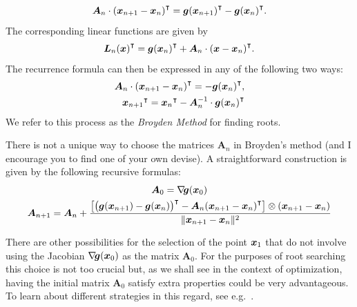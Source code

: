\begin{equation}\label{equation:SecantProperty}
\boldsymbol{A}_n \cdot {(\boldsymbol{x}_{n+1} - \boldsymbol{x}_n)}^\intercal = {\boldsymbol{g}(\boldsymbol{x}_{n+1})}^\intercal - {\boldsymbol{g}(\boldsymbol{x}_n)}^\intercal.
\end{equation}
The corresponding linear functions are given by 
\begin{equation*}
{\boldsymbol{L}_n (\boldsymbol{x})}^\intercal = {\boldsymbol{g}(\boldsymbol{x}_n)}^\intercal + \boldsymbol{A}_n \cdot {(\boldsymbol{x}- \boldsymbol{x}_n)}^\intercal.
\end{equation*}
The recurrence formula can then be expressed in any of the following two ways:
\begin{equation}
\begin{split}
\boldsymbol{A}_n \cdot {(\boldsymbol{x}_{n+1} - \boldsymbol{x}_n )}^\intercal = -{\boldsymbol{g}(\boldsymbol{x}_n)}^\intercal, \\
{\boldsymbol{x}_{n+1}}^\intercal = {\boldsymbol{x}_n}^\intercal - \boldsymbol{A}_n^{-1} \cdot {\boldsymbol{g}(\boldsymbol{x}_n)}^\intercal
\end{split}
\end{equation}
We refer to this process as the \emph{Broyden Method} for finding roots.

\begin{remark}
There is not a unique way to choose the matrices $\boldsymbol{A}_n$ in Broyden's method (and I encourage you to find one of your own devise).  A straightforward construction is given by the following recursive formulas:
\begin{gather}\index{Broyden Method!recursive formula}\index{Broyden Method!iteration}
\boldsymbol{A}_0 = \gradient{\boldsymbol{g}}(\x_0) \nonumber \\
\boldsymbol{A}_{n+1} = \boldsymbol{A}_n + \frac{\big[ \transpose{\big(\boldsymbol{g}(\x_{n+1})-\boldsymbol{g}(\x_n)\big)} - \boldsymbol{A}_n \transpose{(\x_{n+1}-\x_n)} \big] \otimes (\x_{n+1} -\x_n)}{\norm{\x_{n+1}-\x_n}^2} \label{equation:Broyden}
\end{gather}
\end{remark}

\begin{remark}
There are other possibilities for the selection of the point $\boldsymbol{x}_1$ that do not involve using the Jacobian $\mathop{\nabla\! {\boldsymbol{g}}}(\boldsymbol{x}_0)$ as the matrix $\boldsymbol{A}_0$.  For the purposes of root searching this choice is not too crucial but, as we shall see in the context of optimization, having the initial matrix $\boldsymbol{A}_0$ satisfy extra properties could be very advantageous.  To learn about different strategies in this regard, see e.g.~\cite[chapter 8]{dennis1996numerical}.
\end{remark}

